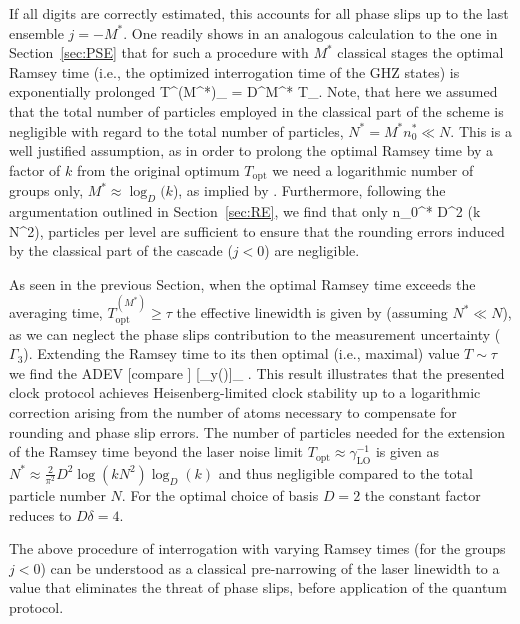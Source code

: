 If all digits are correctly estimated, this accounts for all phase slips up to
the last ensemble $j=-M^*$. One readily shows in an analogous calculation to the
one  in Section~\ref{sec:PSE} that for such a procedure with $M^*$ classical
stages the optimal Ramsey time (i.e., the optimized interrogation time of the
GHZ states) is exponentially prolonged
\bel
\label{eq:EK5}
T^{(M^*)}_ = D^{M^*} T_.
\eel
Note, that here we assumed that the total number of particles employed in the classical part of the scheme is negligible with regard to the total number of particles, $N^*=M^* n_0^* \ll N$. This is a well justified assumption, as in order to 
prolong the optimal Ramsey time by a factor of $k$ from the original optimum $T_\mathrm{opt}$ 
 we need a logarithmic number of groups only, $M^*\approx\log_D(k$), as implied by . 
Furthermore, following the argumentation outlined in Section~\ref{sec:RE}, we find that only
\bel
 n_0^* \geq {} D^2 \log\left(k N^2\right),
\eel
particles per level are sufficient to ensure that the rounding errors induced by the classical part of the cascade ($j<0$) are negligible. 

 As seen in the previous Section, when the optimal Ramsey time exceeds the
 averaging time, $T^{(M^*)}_\mathrm{opt} \geq \tau$ the effective linewidth is
 given by  (assuming $N^*\ll N$), as we can neglect the phase
 slips contribution to the measurement uncertainty ($\Gamma_3$). Extending the
 Ramsey time to its then optimal (i.e., maximal)  value $T\sim\tau$ we find the
 ADEV [compare ]
\bel
	\label{eq:sigma_y^2 boxed}
	[\sigma_y(\tau)]_\approx {} 
	\approx {}  .
\eel
This result illustrates that the presented clock protocol achieves Heisenberg-limited clock stability up to a logarithmic correction arising from the number of atoms necessary to compensate for rounding and phase slip errors. The number of particles needed for the extension of the Ramsey time beyond the laser noise limit $T_\mathrm{opt}\approx\gamma_\mathrm{LO}^{-1}$ is given as $N^{*}\approx \frac{2}{\pi^2} D^2 \log\left(k N^2\right)\log_D(k)$ and thus negligible compared to the total particle number $N$. For the optimal choice of basis $D=2$ the constant factor reduces to $ D\delta = 4$. 

The above procedure of interrogation with varying Ramsey times (for the groups $j<0$)  can be understood as a classical pre-narrowing of the laser linewidth \cite{Rosenband2013} to a value that eliminates the threat of phase slips,  before application of the quantum protocol. 

